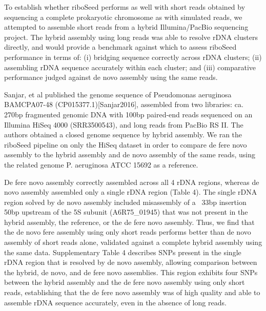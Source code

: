 \documentclass[11pt]{article}
\begin{document}
\begin{linenumbers}
To establish whether riboSeed performs as well with short reads obtained by sequencing a complete prokaryotic chromosome as with simulated reads, we attempted to assemble short reads from a hybrid Illumina/PacBio sequencing project. The hybrid assembly using long reads was able to resolve rDNA clusters directly, and would provide a benchmark against which to assess riboSeed performance in terms of: (i) bridging sequence correctly across rDNA clusters; (ii) assembling rDNA sequence accurately within each cluster; and (iii) comparative performance judged against de novo assembly using the same reads.


Sanjar, et al published the genome sequence of Pseudomonas aeruginosa BAMCPA07-48 (CP015377.1)[Sanjar2016], assembled from two libraries: ca. 270bp fragmented genomic DNA with 100bp paired-end reads sequenced on an Illumina HiSeq 4000 (SRR3500543), and long reads from PacBio RS II. The authors obtained a closed genome sequence by hybrid assembly. We ran the riboSeed pipeline on only the HiSeq dataset in order to compare de fere novo assembly to the hybrid assembly and de novo assembly of the same reads, using the related genome P. aeruginosa ATCC 15692 as a reference.



De fere novo assembly correctly assembled across all 4 rDNA regions, whereas de novo assembly assembled only a single rDNA region (Table 4). The single rDNA region solved by de novo assembly included misassembly of a ~33bp insertion 50bp upstream of the 5S subunit (A6R75\_01945) that was not present in the hybrid assembly, the reference, or the de fere novo assembly. Thus, we find that the de novo fere assembly using only short reads performs better than de novo assembly of short reads alone, validated against a complete hybrid assembly using the same data. Supplementary Table 4 describes SNPs present in the single rDNA region that is resolved by de novo assembly, allowing comparison between the hybrid, de novo, and de fere novo assemblies. This region exhibits four SNPs between the hybrid assembly and the de fere novo assembly using only short reads, establishing that the de fere novo assembly was of high quality and able to assemble rDNA sequence accurately, even in the absence of long reads.



\end{linenumbers}
\end{document}
